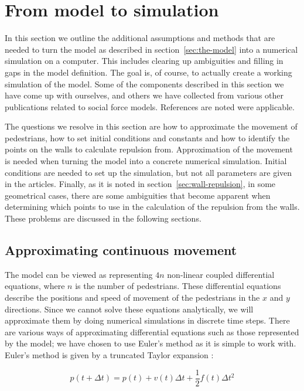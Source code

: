 \section{From model to simulation}
\label{sec:model-to-simulation}
In this section we outline the additional assumptions and methods that are 
needed to turn the model as described in section~\ref{sec:the-model} into a 
numerical simulation on a computer. This includes clearing up ambiguities and 
filling in gaps in the model definition.  The goal is, of course, to actually 
create a working simulation of the model.  Some of the components described in 
this section we have come up with ourselves, and others we have collected from 
various other publications related to social force models. References are 
noted were applicable.

The questions we resolve in this section are how to approximate the movement 
of pedestrians, how to set initial conditions and constants and how to 
identify the points on the walls to calculate repulsion from. Approximation of 
the movement is needed when turning the model into a concrete numerical 
simulation. Initial conditions are needed to set up the simulation, but not 
all parameters are given in the articles. Finally, as it is noted in 
section~\ref{sec:wall-repulsion}, in some geometrical cases, there are some 
ambiguities that become apparent when determining which points to use in the 
calculation of the repulsion from the walls. These problems are discussed in 
the following sections.


\subsection{Approximating continuous movement}
The model can be viewed as representing $4n$ non-linear coupled differential 
equations, where $n$ is the number of pedestrians. These differential 
equations describe the positions and speed of movement of the pedestrians in 
the $x$ and $y$ directions. Since we cannot solve these equations 
analytically, we will approximate them by doing numerical simulations in 
discrete time steps. There are various ways of approximating differential 
equations such as those represented by the model; we have chosen to use 
Euler's method as it is simple to work with. Euler's method is given by a 
truncated Taylor expansion \cite{MD}:

\begin{equation}
    p(t+\Delta t)=p(t)+v(t)\Delta t + \frac{1}{2}f(t)\Delta t^2
\end{equation}     

